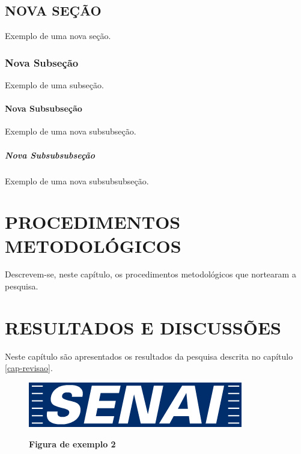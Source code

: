 \documentclass[
	12pt,				%
	openright,			%
	oneside,			%
	a4paper,			%
	chapter=TITLE,		%
	section=TITLE,		%
	brazil				%
	]{abntex2}
\begin{document}
\section{NOVA SEÇÃO}

Exemplo de uma nova seção.

\subsection{Nova Subseção}

Exemplo de uma subseção.

\subsubsection{Nova Subsubseção}

Exemplo de uma nova subsubseção.



\paragraph{Nova Subsubsubseção}

Exemplo de uma nova subsubsubseção.

\chapter{PROCEDIMENTOS METODOLÓGICOS}

Descrevem-se, neste capítulo, os procedimentos metodológicos que nortearam a pesquisa.

\chapter{RESULTADOS E DISCUSSÕES}

Neste capítulo são apresentados os resultados da pesquisa descrita no capítulo \ref{cap-revisao}.

\begin{figure}[htb]
  \begin{center}
    \caption{\textbf{Figura de exemplo 2}}\label{fig-exemplo1}
    \includegraphics [scale=0.6]{logo-senai.jpg}
    \label{fig-exemplo1}
  \end{center}
\end{figure}
\end{document}
